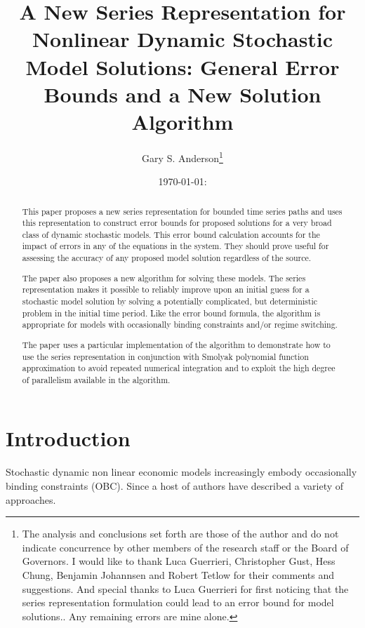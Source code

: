 \documentclass[12pt]{article}
\author{Gary S. Anderson\thanks{The analysis and conclusions set forth are those of the author and do not indicate concurrence by other members of the research staff or the Board of Governors. I would like to thank Luca Guerrieri, Christopher Gust, Hess Chung, Benjamin Johannsen  and Robert Tetlow for their comments and suggestions.  And special thanks to Luca Guerrieri for first noticing that the series representation formulation could lead to an error bound for model solutions.. Any remaining errors are mine alone.}}
\title{A New Series Representation for 
Nonlinear Dynamic Stochastic Model Solutions: General Error Bounds and a New Solution Algorithm}
\date{\today: \currenttime}
\begin{document}
\maketitle

\begin{abstract}
This paper proposes a new series representation for bounded time series paths and uses this representation to construct error bounds for proposed solutions for a very broad class of dynamic stochastic models.
This error bound calculation accounts for the impact of errors in any of the equations in the system.  They should prove useful for assessing the accuracy of any
proposed model solution regardless of the source.


The paper also proposes a new algorithm for solving these models.
The series representation makes it possible to reliably improve upon an initial
guess for a stochastic model solution by solving a 
potentially complicated, but deterministic problem in the initial time period.
Like the error bound formula, the algorithm is appropriate for models with occasionally binding constraints and/or regime switching. 


The  paper uses a particular implementation of the algorithm to
demonstrate how to use the 
series representation in conjunction with 
Smolyak polynomial function approximation to avoid repeated numerical integration
and to exploit the high degree of parallelism available in the algorithm.







\end{abstract}

\newpage
\tableofcontents
\newpage

\section{Introduction}





Stochastic dynamic non linear economic
models increasingly embody  occasionally binding constraints (OBC).
Since \cite{Christiano2000} a host of
authors have described a variety of approaches. 
\cite{holden15:_exist_dsge,guerrieri15:_occbin,benigno09,hintermaier10,brumm10,nakov08,haefke98,nakata12,gordon11,billi11,Hintermaier2010,Guerrieri2015}
\end{document}
